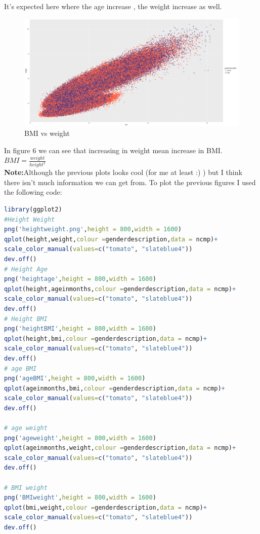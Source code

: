 \documentclass{article}
\begin{document}
It's expected here where the age increase , the weight increase as well.
\begin{figure}[H]
	\begin{center}
		\includegraphics[scale=0.3]{BMIweight.png}
	\end{center}
	\caption{BMI vs weight}
\end{figure}
In figure 6 we can see that increasing in weight mean increase in BMI.
\(BMI = \frac{weight}{height^2}\) \\
\textbf{Note:}Although the previous plots looks cool (for me at least :) ) but I think there isn't much information we can get from.
To plot the previous figures I used the following code:
\begin{lstlisting}[language=R]
library(ggplot2)
#Height Weight
png('heightweight.png',height = 800,width = 1600)
qplot(height,weight,colour =genderdescription,data = ncmp)+ 
scale_color_manual(values=c("tomato", "slateblue4"))
dev.off()
# Height Age
png('heightage',height = 800,width = 1600)
qplot(height,ageinmonths,colour =genderdescription,data = ncmp)+ 
scale_color_manual(values=c("tomato", "slateblue4"))
dev.off()
# Height BMI
png('heightBMI',height = 800,width = 1600)
qplot(height,bmi,colour =genderdescription,data = ncmp)+ 
scale_color_manual(values=c("tomato", "slateblue4"))
dev.off()
# age BMI
png('ageBMI',height = 800,width = 1600)
qplot(ageinmonths,bmi,colour =genderdescription,data = ncmp)+ 
scale_color_manual(values=c("tomato", "slateblue4"))
dev.off()

# age weight
png('ageweight',height = 800,width = 1600)
qplot(ageinmonths,weight,colour =genderdescription,data = ncmp)+ 
scale_color_manual(values=c("tomato", "slateblue4"))
dev.off()

# BMI weight
png('BMIweight',height = 800,width = 1600)
qplot(bmi,weight,colour =genderdescription,data = ncmp)+ 
scale_color_manual(values=c("tomato", "slateblue4"))
dev.off()

\end{lstlisting}
\end{document}

